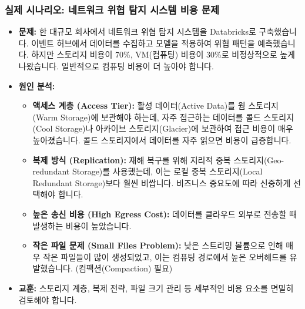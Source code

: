 \documentclass[11pt,a4paper]{article}
\begin{document}
\subsubsection{실제 시나리오: 네트워크 위협 탐지 시스템 비용 문제}
\begin{itemize}
    \item \textbf{문제:} 한 대규모 회사에서 네트워크 위협 탐지 시스템을 Databricks로 구축했습니다. 이벤트 허브에서 데이터를 수집하고 모델을 적용하여 위협 패턴을 예측했습니다. 하지만 스토리지 비용이 70\%, VM(컴퓨팅) 비용이 30\%로 비정상적으로 높게 나왔습니다. 일반적으로 컴퓨팅 비용이 더 높아야 합니다.
    \item \textbf{원인 분석:}
    \begin{itemize}
        \item \textbf{액세스 계층 (Access Tier):} 활성 데이터(Active Data)를 웜 스토리지(Warm Storage)에 보관해야 하는데, 자주 접근하는 데이터를 콜드 스토리지(Cool Storage)나 아카이브 스토리지(Glacier)에 보관하여 접근 비용이 매우 높아졌습니다. 콜드 스토리지에서 데이터를 자주 읽으면 비용이 급증합니다.
        \item \textbf{복제 방식 (Replication):} 재해 복구를 위해 지리적 중복 스토리지(Geo-redundant Storage)를 사용했는데, 이는 로컬 중복 스토리지(Local Redundant Storage)보다 훨씬 비쌉니다. 비즈니스 중요도에 따라 신중하게 선택해야 합니다.
        \item \textbf{높은 송신 비용 (High Egress Cost):} 데이터를 클라우드 외부로 전송할 때 발생하는 비용이 높았습니다.
        \item \textbf{작은 파일 문제 (Small Files Problem):} 낮은 스트리밍 볼륨으로 인해 매우 작은 파일들이 많이 생성되었고, 이는 컴퓨팅 경로에서 높은 오버헤드를 유발했습니다. (컴팩션(Compaction) 필요)
    \end{itemize}
    \item \textbf{교훈:} 스토리지 계층, 복제 전략, 파일 크기 관리 등 세부적인 비용 요소를 면밀히 검토해야 합니다.
\end{itemize}
\end{document}
